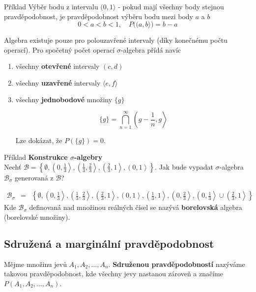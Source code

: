 \begin{note}{Příklad}
Výběr bodu z intervalu $(0, 1\rangle$ - pokud mají všechny body stejnou pravděpodobnost, je pravděpodobnost výběru bodu mezi body $a$ a $b$
\[ 0<a<b<1,\quad P\big((a,b\rangle\big)=b-a \]
\end{note}

Algebra existuje pouze pro polouzavřené intervaly (díky konečnému počtu operací). Pro spočetný počet operací $\sigma$-algebra přídá navíc
\begin{enumerate}[noitemsep]
\item všechny \textbf{otevřené} intervaly $(c,d)$
\item všechny \textbf{uzavřené} intervaly $\langle e,f\rangle$
\item všechny \textbf{jednobodové} množiny $\{ g\}$

\[ \{g\}=\bigcap_{n=1}^\infty\left(g-\frac{1}{n}, g\right\rangle \]

Lze dokázat, že $P(\{g\})=0$.
\end{enumerate}

\begin{note}{Příklad}
\textbf{Konstrukce $\sigma$-algebry}\\
Nechť $\mathscr{B}=\left\{\emptyset, \left(0,\frac{1}{3}\right\rangle, \left(\frac{1}{3},\frac{2}{3}\right\rangle, \left(\frac{2}{3},1\right\rangle, \left(0,1\right\rangle\right\}$. Jak bude vypadat $\sigma$-algebra $\mathscr{B}_\sigma$ generovaná z $\mathscr{B}$?

\begin{eqnarray*}
\mathscr{B}_\sigma & = & \left\{\emptyset, \left(0,\frac{1}{3}\right\rangle, \left(\frac{1}{3},\frac{2}{3}\right\rangle, \left(\frac{2}{3},1\right\rangle, \left(0,1\right\rangle\right.,\left.\left(\frac{1}{3},1\right\rangle, \left(0,\frac{2}{3}\right\rangle,\left(0,\frac{1}{3}\right\rangle\cup\left(\frac{2}{3},1\right\rangle\right\}
\end{eqnarray*}
Kde $\mathscr{B}_\sigma$ definovaná nad množinou reálných čísel se nazývá \textbf{borelovská} algebra (borelovské množiny).
\end{note}

\subsection{Sdružená a marginální pravděpodobnost}
Mějme množinu jevů $A_1,A_2,\ldots, A_n$. \textbf{Sdruženou pravděpodobností} nazýváme takovou pravděpodobnost, kde všechny jevy nastanou zároveň a značíme $P(A_1,A_2,\ldots, A_n)$.\br

